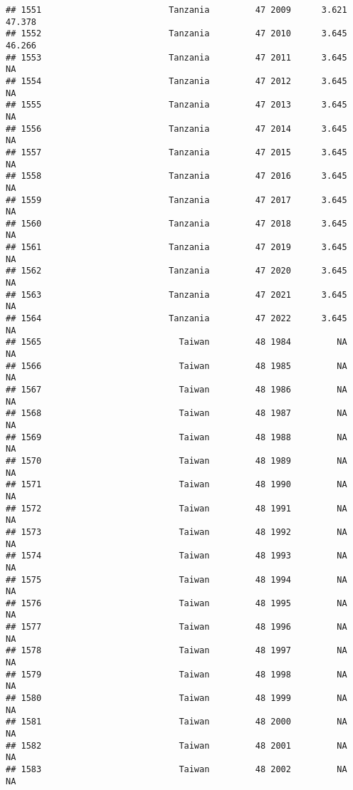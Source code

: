 \documentclass[
]{article}
\begin{document}
\begin{verbatim}
## 1551                         Tanzania         47 2009      3.621     47.378
## 1552                         Tanzania         47 2010      3.645     46.266
## 1553                         Tanzania         47 2011      3.645         NA
## 1554                         Tanzania         47 2012      3.645         NA
## 1555                         Tanzania         47 2013      3.645         NA
## 1556                         Tanzania         47 2014      3.645         NA
## 1557                         Tanzania         47 2015      3.645         NA
## 1558                         Tanzania         47 2016      3.645         NA
## 1559                         Tanzania         47 2017      3.645         NA
## 1560                         Tanzania         47 2018      3.645         NA
## 1561                         Tanzania         47 2019      3.645         NA
## 1562                         Tanzania         47 2020      3.645         NA
## 1563                         Tanzania         47 2021      3.645         NA
## 1564                         Tanzania         47 2022      3.645         NA
## 1565                           Taiwan         48 1984         NA         NA
## 1566                           Taiwan         48 1985         NA         NA
## 1567                           Taiwan         48 1986         NA         NA
## 1568                           Taiwan         48 1987         NA         NA
## 1569                           Taiwan         48 1988         NA         NA
## 1570                           Taiwan         48 1989         NA         NA
## 1571                           Taiwan         48 1990         NA         NA
## 1572                           Taiwan         48 1991         NA         NA
## 1573                           Taiwan         48 1992         NA         NA
## 1574                           Taiwan         48 1993         NA         NA
## 1575                           Taiwan         48 1994         NA         NA
## 1576                           Taiwan         48 1995         NA         NA
## 1577                           Taiwan         48 1996         NA         NA
## 1578                           Taiwan         48 1997         NA         NA
## 1579                           Taiwan         48 1998         NA         NA
## 1580                           Taiwan         48 1999         NA         NA
## 1581                           Taiwan         48 2000         NA         NA
## 1582                           Taiwan         48 2001         NA         NA
## 1583                           Taiwan         48 2002         NA         NA

\end{verbatim}
\end{document}
